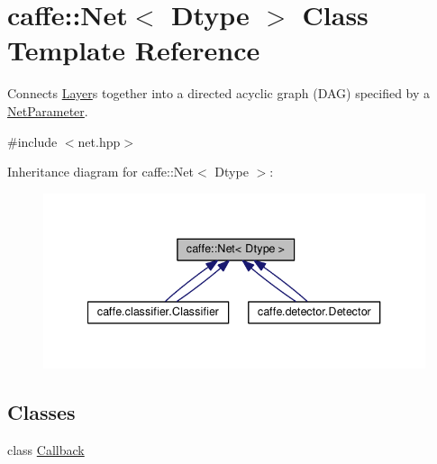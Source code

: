 \hypertarget{classcaffe_1_1_net}{}\section{caffe\+:\+:Net$<$ Dtype $>$ Class Template Reference}
\label{classcaffe_1_1_net}


Connects \mbox{\hyperlink{classcaffe_1_1_layer}{Layer}}s together into a directed acyclic graph (D\+AG) specified by a \mbox{\hyperlink{classcaffe_1_1_net_parameter}{Net\+Parameter}}.  




{\ttfamily \#include $<$net.\+hpp$>$}



Inheritance diagram for caffe\+:\+:Net$<$ Dtype $>$\+:
\nopagebreak
\begin{figure}[H]
\begin{center}
\leavevmode
\includegraphics[width=340pt]{classcaffe_1_1_net__inherit__graph}
\end{center}
\end{figure}
\subsection*{Classes}
\begin{DoxyCompactItemize}
\item 
class \mbox{\hyperlink{classcaffe_1_1_net_1_1_callback}{Callback}}
\end{DoxyCompactItemize}
